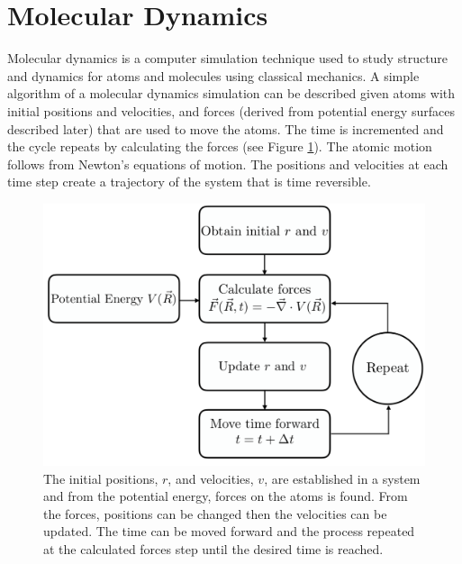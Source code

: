 \section{Molecular Dynamics}
Molecular dynamics is a computer simulation technique used to study structure and dynamics for atoms and molecules using classical mechanics. 
A simple algorithm of a molecular dynamics simulation can be described given atoms with initial positions and velocities, and forces (derived from potential energy surfaces described later) that are used to move the atoms. The time is incremented and the cycle repeats by calculating the forces (see Figure \ref{fig:MDschematic}). The atomic motion follows from Newton's equations of motion. The positions and velocities at each time step create a trajectory of the system that is time reversible. 

\begin{figure}
    \includegraphics[scale=0.45]{figures/MDschematic.pdf}
    \caption{The initial positions, $r$, and velocities, $v$, are established in a system and from the potential energy, forces on the atoms is found. From the forces, positions can be changed then the velocities can be updated. The time can be moved forward and the process repeated at the calculated forces step until the desired time is reached.}
    \label{fig:MDschematic}
\end{figure}

